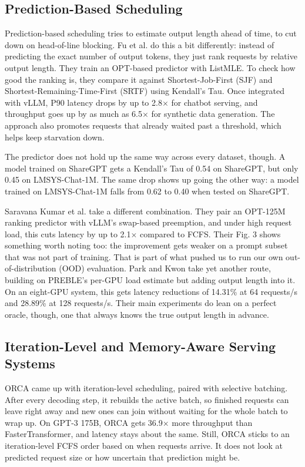 \subsection{Prediction-Based Scheduling}
Prediction-based scheduling tries to estimate output length ahead of time, to cut down on head-of-line blocking. Fu et al. \cite{fu2024ltr} do this a bit differently: instead of predicting the exact number of output tokens, they just rank requests by relative output length. They train an OPT-based predictor with ListMLE. To check how good the ranking is, they compare it against Shortest-Job-First (SJF) and Shortest-Remaining-Time-First (SRTF) using Kendall's Tau. Once integrated with vLLM, P90 latency drops by up to 2.8$\times$ for chatbot serving, and throughput goes up by as much as 6.5$\times$ for synthetic data generation. The approach also promotes requests that already waited past a threshold, which helps keep starvation down.

The predictor does not hold up the same way across every dataset, though. A model trained on ShareGPT gets a Kendall's Tau of 0.54 on ShareGPT, but only 0.45 on LMSYS-Chat-1M. The same drop shows up going the other way: a model trained on LMSYS-Chat-1M falls from 0.62 to 0.40 when tested on ShareGPT.

Saravana Kumar et al. \cite{kumar2024latency} take a different combination. They pair an OPT-125M ranking predictor with vLLM's swap-based preemption, and under high request load, this cuts latency by up to 2.1$\times$ compared to FCFS. Their Fig. 3 shows something worth noting too: the improvement gets weaker on a prompt subset that was not part of training. That is part of what pushed us to run our own out-of-distribution (OOD) evaluation. Park and Kwon \cite{park2024prefixoutput} take yet another route, building on PREBLE's per-GPU load estimate but adding output length into it. On an eight-GPU system, this gets latency reductions of 14.31\% at 64 requests/s and 28.89\% at 128 requests/s. Their main experiments do lean on a perfect oracle, though, one that always knows the true output length in advance.



\subsection{Iteration-Level and Memory-Aware Serving Systems}
ORCA \cite{yu2022orca} came up with iteration-level scheduling, paired with selective batching. After every decoding step, it rebuilds the active batch, so finished requests can leave right away and new ones can join without waiting for the whole batch to wrap up. On GPT-3 175B, ORCA gets 36.9$\times$ more throughput than FasterTransformer, and latency stays about the same. Still, ORCA sticks to an iteration-level FCFS order based on when requests arrive. It does not look at predicted request size or how uncertain that prediction might be.

